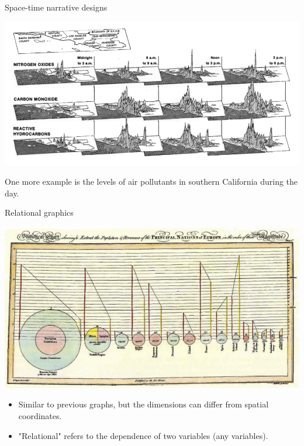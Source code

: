 \documentclass[
  ignorenonframetext,
]{beamer}
\begin{document}
\begin{frame}{Space-time narrative designs}
\label{space-time-narrative-designs-2}
\begin{minipage}{1\textwidth}
\centering
\includegraphics[width=\textwidth]{excellence_figs/fig_23.png}
\end{minipage}
\hfill
\begin{minipage}{1\textwidth}
\footnotesize
\vspace{3mm}
One more example is the levels of air pollutants in southern California during the day.
\end{minipage}
\end{frame}

\begin{frame}{Relational graphics}
\label{relational-graphics}
\begin{minipage}{1\textwidth}
\centering
\includegraphics[width=\textwidth]{excellence_figs/fig_24.png}
\end{minipage}
\hfill \vspace{3mm}
\begin{minipage}{1\textwidth}
\footnotesize
\begin{itemize}
  \item Similar to previous graphs, but the dimensions can differ from spatial coordinates.
  \item "Relational" refers to the dependence of two variables (any variables).
\end{itemize}
\end{minipage}
\end{frame}
\end{document}
